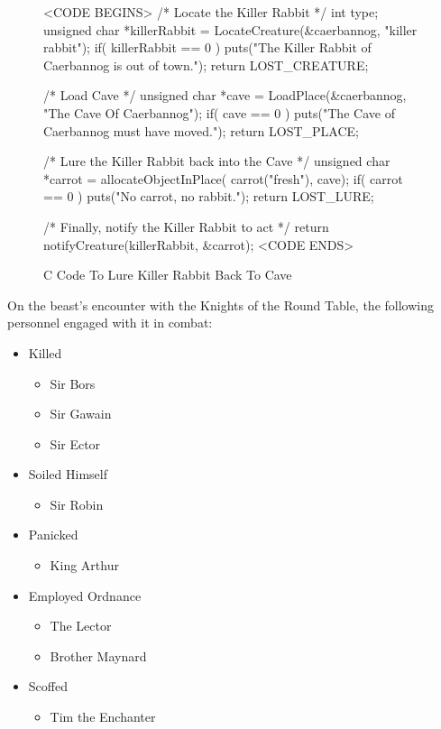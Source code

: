 \documentclass{metanorma}
\newenvironment{sourcecode}{\verbatim}{\endverbatim}
\begin{document}
\begin{figure}[h]\centering
\label{killer-source}
\begin{sourcecode}{c}
\caption{C Code To Lure Killer Rabbit Back To Cave}
<CODE BEGINS>
/* Locate the Killer Rabbit */
int type;
unsigned char *killerRabbit =
  LocateCreature(&caerbannog, "killer rabbit");
if( killerRabbit == 0 ){
  puts("The Killer Rabbit of Caerbannog is out of town.");
  return LOST_CREATURE;
}

/* Load Cave */
unsigned char *cave = LoadPlace(&caerbannog,
  "The Cave Of Caerbannog");
if( cave == 0 ){
  puts("The Cave of Caerbannog must have moved.");
  return LOST_PLACE;
}

/* Lure the Killer Rabbit back into the Cave */
unsigned char *carrot = allocateObjectInPlace(
  carrot("fresh"), cave);
if( carrot == 0 ){
  puts("No carrot, no rabbit.");
  return LOST_LURE;
}

/* Finally, notify the Killer Rabbit to act */
return notifyCreature(killerRabbit, &carrot);
<CODE ENDS>
\end{sourcecode}
\end{figure}



On the beast's encounter with the Knights of the Round Table,
the following personnel engaged with it in combat:


\begin{itemize}
  \item Killed
    \begin{itemize}
      \item Sir Bors
      \item Sir Gawain
      \item Sir Ector
    \end{itemize}
  \item Soiled Himself
    \begin{itemize}
      \item Sir Robin
    \end{itemize}
  \item Panicked
    \begin{itemize}
      \item King Arthur
    \end{itemize}
  \item Employed Ordnance
    \begin{itemize}
      \item The Lector
      \item Brother Maynard
    \end{itemize}
  \item Scoffed
    \begin{itemize}
      \item Tim the Enchanter
    \end{itemize}
\end{itemize}
\end{document}
